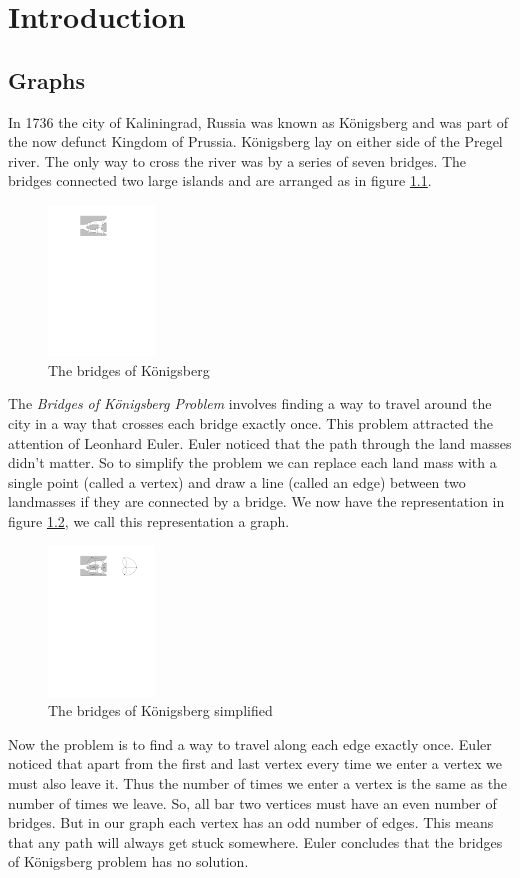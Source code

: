 \chapter{Introduction}\label{chpt:into}

\section{Graphs}
In 1736 the city of Kaliningrad, Russia was known as K\"{o}nigsberg and was part of the now defunct Kingdom of Prussia. K\"{o}nigsberg lay on either side of the Pregel river. The only way to cross the river was by a series of seven bridges. The bridges connected two large islands and are arranged as in figure \ref{fig:bridges1}. 
\begin{figure}[h]
    \centering
    \includegraphics[height=40mm]{images/161-fig26} 
    \caption{The bridges of K\"{o}nigsberg}
    \label{fig:bridges1}
\end{figure}
The \textit{Bridges of K\"{o}nigsberg Problem} involves finding a way to travel around the city in a way that crosses each bridge exactly once. This problem attracted the attention of Leonhard Euler. Euler noticed that the path through the land masses didn't matter. So to simplify the problem we can replace each land mass with a single point (called a vertex) and draw a line (called an edge) between two landmasses if they are connected by a bridge. We now have the representation in figure \ref{fig:bridges2}, we call this representation a graph.
\begin{figure} [h]
    \centering
        \includegraphics[height=40mm]{images/161-fig27}
    \caption{The bridges of K\"{o}nigsberg simplified}
    \label{fig:bridges2}
\end{figure} 
Now the problem is to find a way to travel along each edge exactly once. Euler noticed that apart from the first and last vertex every time we enter a vertex we must also leave it. Thus the number of times we enter a vertex is the same as the number of times we leave. So, all bar two vertices must have an even number of bridges. But in our graph each vertex has an odd number of edges. This means that any path will always get stuck somewhere. Euler concludes that the bridges of K\"{o}nigsberg problem has no solution.


